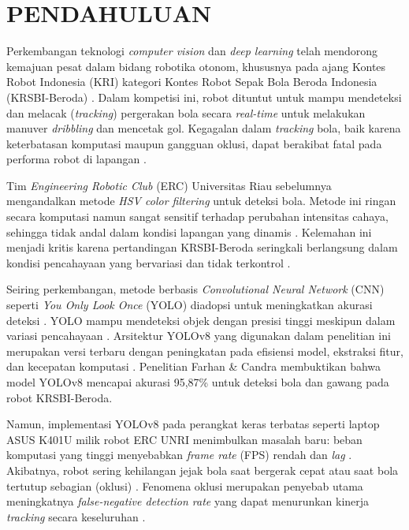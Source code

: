 \documentclass[12pt,a4paper]{article}
\begin{document}
\vspace{0.5cm}

\section{PENDAHULUAN}

Perkembangan teknologi \textit{computer vision} dan \textit{deep learning} telah mendorong kemajuan pesat dalam bidang robotika otonom, khususnya pada ajang Kontes Robot Indonesia (KRI) kategori Kontes Robot Sepak Bola Beroda Indonesia (KRSBI-Beroda) \cite{Kusumoputro2024}. Dalam kompetisi ini, robot dituntut untuk mampu mendeteksi dan melacak (\textit{tracking}) pergerakan bola secara \textit{real-time} untuk melakukan manuver \textit{dribbling} dan mencetak gol. Kegagalan dalam \textit{tracking} bola, baik karena keterbatasan komputasi maupun gangguan oklusi, dapat berakibat fatal pada performa robot di lapangan \cite{Nanda2023}.

Tim \textit{Engineering Robotic Club} (ERC) Universitas Riau sebelumnya mengandalkan metode \textit{HSV color filtering} untuk deteksi bola. Metode ini ringan secara komputasi namun sangat sensitif terhadap perubahan intensitas cahaya, sehingga tidak andal dalam kondisi lapangan yang dinamis \cite{Nanda2023}. Kelemahan ini menjadi kritis karena pertandingan KRSBI-Beroda seringkali berlangsung dalam kondisi pencahayaan yang bervariasi dan tidak terkontrol \cite{Kusumoputro2024}.

Seiring perkembangan, metode berbasis \textit{Convolutional Neural Network} (CNN) seperti \textit{You Only Look Once} (YOLO) diadopsi untuk meningkatkan akurasi deteksi \cite{Farhan2025}. YOLO mampu mendeteksi objek dengan presisi tinggi meskipun dalam variasi pencahayaan \cite{Redmon2016}. Arsitektur YOLOv8 yang digunakan dalam penelitian ini merupakan versi terbaru dengan peningkatan pada efisiensi model, ekstraksi fitur, dan kecepatan komputasi \cite{Yaseen2024, Ultralytics2025}. Penelitian Farhan \& Candra \cite{Farhan2025} membuktikan bahwa model YOLOv8 mencapai akurasi 95,87\% untuk deteksi bola dan gawang pada robot KRSBI-Beroda.

Namun, implementasi YOLOv8 pada perangkat keras terbatas seperti laptop ASUS K401U milik robot ERC UNRI menimbulkan masalah baru: beban komputasi yang tinggi menyebabkan \textit{frame rate} (FPS) rendah dan \textit{lag} \cite{Surya2025}. Akibatnya, robot sering kehilangan jejak bola saat bergerak cepat atau saat bola tertutup sebagian (oklusi) \cite{Ryu2021}. Fenomena oklusi merupakan penyebab utama meningkatnya \textit{false-negative detection rate} yang dapat menurunkan kinerja \textit{tracking} secara keseluruhan \cite{Nuralim2022}.
\end{document}
